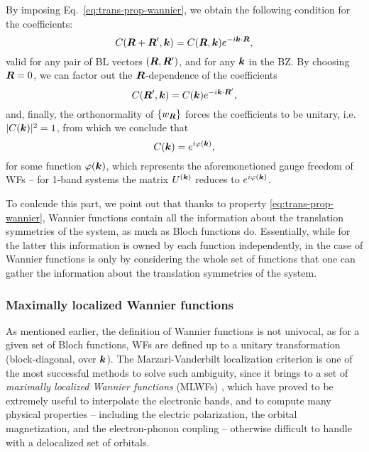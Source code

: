%
By imposing Eq.~\eqref{eq:trans-prop-wannier}, we obtain the following condition for the coefficients:
%
\begin{equation}
    C({\bm R} + {\bm R}', {\bm k}) = C({\bm R}, {\bm k}) e^{-i{\bm k} \cdot {\bm R}} ,
    \label{eq:crk-coefficents-trans-prop}
\end{equation}
%
valid for any pair of BL vectors $({\bm R},{\bm R}')$, and for any ${\bm k}$ in the BZ. By choosing ${\bm R}=0$, we can factor out the ${\bm R}$-dependence of the coefficients
%
\begin{equation}
    C({\bm R}',{\bm k}) = C({\bm k}) e^{-i{\bm k} \cdot {\bm R}'} ,
    \label{eq:crk-coefficients-factor-out}
\end{equation}
%
and, finally, the orthonormality of $\{ w_{{\bm R}} \}$ forces the coefficients to be unitary, i.e. $|C({\bm k})|^2=1$, from which we conclude that
\begin{equation}
    C({\bm k}) = e^{i\varphi({\bm k})} ,
\end{equation}
%
for some function $\varphi({\bm k})$, which represents the aforemonetioned gauge freedom of WFs -- for 1-band systems the matrix $U^{({\bm k})}$ reduces to $e^{i\varphi({\bm k})}$.

To conlcude this part, we point out that thanks to property \eqref{eq:trans-prop-wannier}, Wannier functions contain all the information about the translation symmetries of the system, as much as Bloch functions do. Essentially, while for the latter this information is owned by each function independently, in the case of Wannier functions is only by considering the whole set of functions that one can gather the information about the translation symmetries of the system.

\subsubsection*{Maximally localized Wannier functions}
As mentioned earlier, the definition of Wannier functions is not univocal, as for a given set of Bloch functions, WFs are defined up to a unitary transformation (block-diagonal, over ${\bm k}$). The Marzari-Vanderbilt localization criterion is one of the most successful methods to solve such ambiguity, since it brings to a set of \emph{maximally localized Wannier functions} (MLWFs) \cite{marzari_maximally_1997}, which have proved to be extremely useful to interpolate the electronic bands, and to compute many physical properties \cite{marzari_maximally_2012} -- including the electric polarization, the orbital magnetization, and the electron-phonon coupling -- otherwise difficult to handle with a delocalized set of orbitals.

